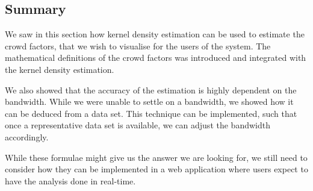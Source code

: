 \subsection{Summary}

We saw in this section how kernel density estimation can be used to estimate the crowd factors, that we wish to visualise for the users of the system. The mathematical definitions of the crowd factors was introduced and integrated with the kernel density estimation.

We also showed that the accuracy of the estimation is highly dependent on the bandwidth. While we were unable to settle on a bandwidth, we showed how it can be deduced from a data set. This technique can be implemented, such that once a representative data set is available, we can adjust the bandwidth accordingly.

While these formulae might give us the answer we are looking for, we still need to consider how they can be implemented in a web application where users expect to have the analysis done in real-time.





